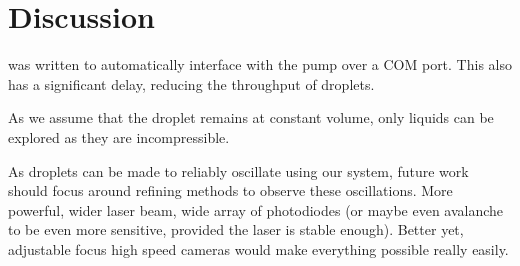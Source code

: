 \documentclass{physics_article_B}
\begin{document}
    
\section{Discussion}

was written to automatically interface with the pump over a COM port. This also has a significant delay, reducing the throughput of droplets.

As we assume that the droplet remains at constant volume, only liquids can be explored as they are incompressible.

As droplets can be made to reliably oscillate using our system, future work should focus around refining methods to observe these oscillations. More powerful, wider laser beam, wide array of photodiodes (or maybe even avalanche to be even more sensitive, provided the laser is stable enough). Better yet, adjustable focus high speed cameras would make everything possible really easily.

\newpage



    

\end{document}
